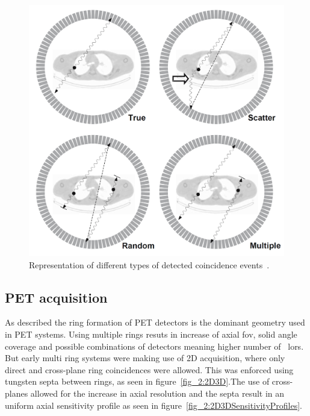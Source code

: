 \begin{figure} [h!]
\centering
\includegraphics[scale=0.22,angle=0]{2_Theory_Methods/figures/Bailey_Scatter_Random_events.png}
\caption{Representation of different types of detected coincidence events~\cite{Bailey2005}. } 
\label{fig_2:EventsIlustration}
\end{figure} 
%
%
\subsection{PET acquisition}
As described the ring formation of PET detectors is the dominant geometry used in PET systems. Using multiple rings resuts in increase of axial \gls{fov}, solid angle coverage and possible combinations of detectors meaning higher number of ~\glspl{lor}. But early multi ring systems were making use of 2D acquisition, where only direct and cross-plane ring coincidences were allowed. 
This was enforced using tungsten septa between rings, as seen in figure~\ref{fig_2:2D3D}.The use of cross-planes allowed for the increase in axial resolution and the septa result in an uniform axial sensitivity profile as seen in figure~\ref{fig_2:2D3DSensitivityProfiles}. 

